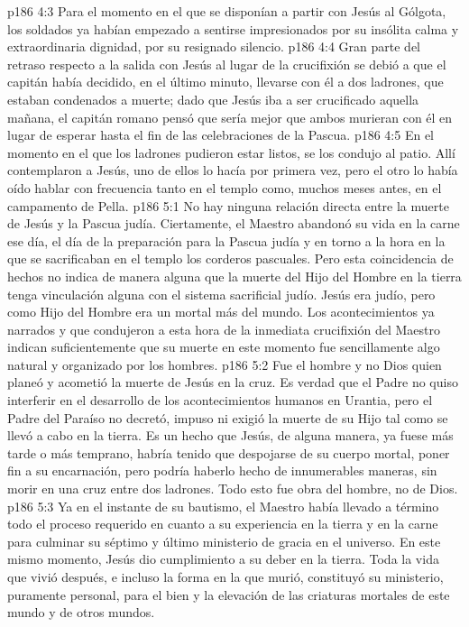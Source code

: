 \vs p186 4:3 Para el momento en el que se disponían a partir con Jesús al Gólgota, los soldados ya habían empezado a sentirse impresionados por su insólita calma y extraordinaria dignidad, por su resignado silencio.
\vs p186 4:4 Gran parte del retraso respecto a la salida con Jesús al lugar de la crucifixión se debió a que el capitán había decidido, en el último minuto, llevarse con él a dos ladrones, que estaban condenados a muerte; dado que Jesús iba a ser crucificado aquella mañana, el capitán romano pensó que sería mejor que ambos murieran con él en lugar de esperar hasta el fin de las celebraciones de la Pascua.
\vs p186 4:5 En el momento en el que los ladrones pudieron estar listos, se los condujo al patio. Allí contemplaron a Jesús, uno de ellos lo hacía por primera vez, pero el otro lo había oído hablar con frecuencia tanto en el templo como, muchos meses antes, en el campamento de Pella.
\vs p186 5:1 No hay ninguna relación directa entre la muerte de Jesús y la Pascua judía. Ciertamente, el Maestro abandonó su vida en la carne ese día, el día de la preparación para la Pascua judía y en torno a la hora en la que se sacrificaban en el templo los corderos pascuales. Pero esta coincidencia de hechos no indica de manera alguna que la muerte del Hijo del Hombre en la tierra tenga vinculación alguna con el sistema sacrificial judío. Jesús era judío, pero como Hijo del Hombre era un mortal más del mundo. Los acontecimientos ya narrados y que condujeron a esta hora de la inmediata crucifixión del Maestro indican suficientemente que su muerte en este momento fue sencillamente algo natural y organizado por los hombres.
\vs p186 5:2 Fue el hombre y no Dios quien planeó y acometió la muerte de Jesús en la cruz. Es verdad que el Padre no quiso interferir en el desarrollo de los acontecimientos humanos en Urantia, pero el Padre del Paraíso no decretó, impuso ni exigió la muerte de su Hijo tal como se llevó a cabo en la tierra. Es un hecho que Jesús, de alguna manera, ya fuese más tarde o más temprano, habría tenido que despojarse de su cuerpo mortal, poner fin a su encarnación, pero podría haberlo hecho de innumerables maneras, sin morir en una cruz entre dos ladrones. Todo esto fue obra del hombre, no de Dios.
\vs p186 5:3 Ya en el instante de su bautismo, el Maestro había llevado a término todo el proceso requerido en cuanto a su experiencia en la tierra y en la carne para culminar su séptimo y último ministerio de gracia en el universo. En este mismo momento, Jesús dio cumplimiento a su deber en la tierra. Toda la vida que vivió después, e incluso la forma en la que murió, constituyó su ministerio, puramente personal, para el bien y la elevación de las criaturas mortales de este mundo y de otros mundos.
